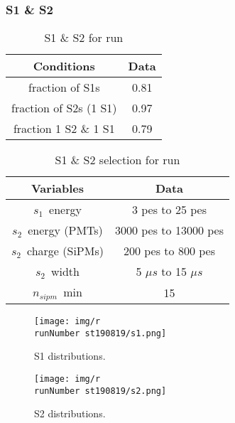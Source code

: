 \begin{frame}
\frametitle{S1 \& S2}

\begin{table}[h!]
\caption{S1 \& S2 for run \runNumber}
\begin{center}
\begin{tabular}{|c|c|}
\hline
Conditions & Data \\
\hline
fraction of S1s & 0.81 \\
fraction of S2s (1 S1) & 0.97 \\
fraction 1 S2 \& 1 S1 & 0.79 \\
\hline
\end{tabular}
\end{center}
\label{r\runNumber.data}
\end{table}%

\begin{table}[h!]
\caption{S1 \& S2 selection for run \runNumber}
\begin{center}
\begin{tabular}{|c|c|}
\hline
Variables & Data \\
\hline
$s_1$~energy & 3 pes to 25 pes \\
$s_2$~energy (PMTs) & 3000 pes to 13000 pes \\
$s_2$~charge (SiPMs) & 200 pes to 800 pes \\
$s_2$~width & 5 $\mu s$ to 15 $\mu s$ \\
$n_{sipm}$~min & 15\\
\hline
\end{tabular}
\end{center}
\label{r\runNumber.sel}
\end{table}%
\end{frame}


\begin{frame}
\begin{figure}
  \begin{center}
      \texttt{[image: img/r\\runNumber st190819/s1.png]}
    \caption{S1 distributions.}
  \end{center}
\end{figure}
\end{frame}

\begin{frame}
\begin{figure}
  \begin{center}
      \texttt{[image: img/r\\runNumber st190819/s2.png]}
    \caption{S2 distributions.}
  \end{center}
\end{figure}
\end{frame}


